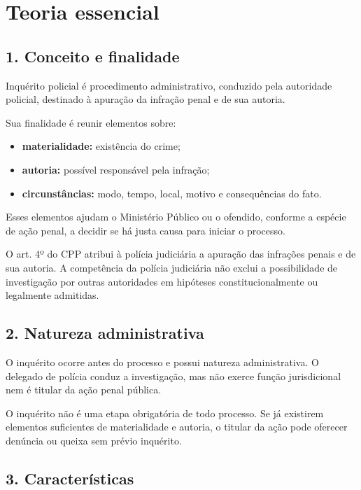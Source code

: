 \documentclass[11pt,a4paper]{article}
\begin{document}
\section*{Teoria essencial}

\subsection*{1. Conceito e finalidade}

Inquérito policial é procedimento administrativo, conduzido pela autoridade policial, destinado à apuração da infração penal e de sua autoria.

Sua finalidade é reunir elementos sobre:

\begin{itemize}
  \item \textbf{materialidade:} existência do crime;
  \item \textbf{autoria:} possível responsável pela infração;
  \item \textbf{circunstâncias:} modo, tempo, local, motivo e consequências do fato.
\end{itemize}

Esses elementos ajudam o Ministério Público ou o ofendido, conforme a espécie de ação penal, a decidir se há justa causa para iniciar o processo.

O art. 4º do CPP atribui à polícia judiciária a apuração das infrações penais e de sua autoria. A competência da polícia judiciária não exclui a possibilidade de investigação por outras autoridades em hipóteses constitucionalmente ou legalmente admitidas.

\subsection*{2. Natureza administrativa}

O inquérito ocorre antes do processo e possui natureza administrativa. O delegado de polícia conduz a investigação, mas não exerce função jurisdicional nem é titular da ação penal pública.

O inquérito não é uma etapa obrigatória de todo processo. Se já existirem elementos suficientes de materialidade e autoria, o titular da ação pode oferecer denúncia ou queixa sem prévio inquérito.

\subsection*{3. Características}
\end{document}
